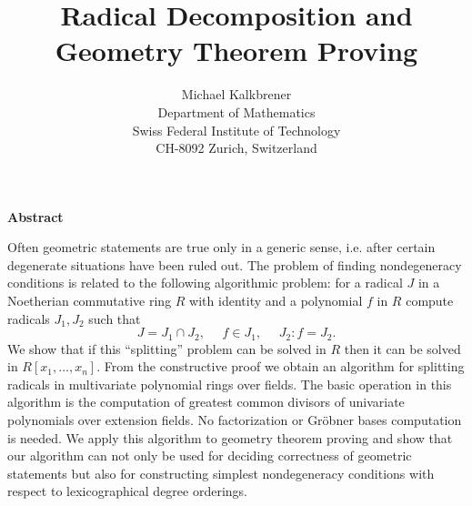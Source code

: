 \title{Radical Decomposition and Geometry Theorem Proving}
\author{Michael Kalkbrener\\Department of Mathematics\\
Swiss Federal Institute of 
Technology\\
CH-8092 Zurich, Switzerland}
\date{} 

\pagestyle{empty}
\maketitle

\vskip 1cm
\centerline{\bf Abstract}

\medskip
Often geometric statements are true only in a generic sense, i.e.
after certain degenerate situations have been ruled out. The problem of
finding nondegeneracy conditions is related to the following algorithmic
problem: for a radical $J$ in a Noetherian commutative ring $R$ with identity
and a polynomial $f$ in $R$ compute radicals $J_1,J_2$ such that 
\[ J=J_1\cap J_2,\ \ \ \ \ \ f\in J_1,\ \ \ \ \ \  J_2:f=J_2. \]
We show that
if this ``splitting'' problem can be solved in $R$ then it can be solved in
$R[x_1,\ldots,x_n]$. From the constructive proof
we obtain an algorithm for splitting radicals in multivariate polynomial
rings over fields.
The basic operation in this algorithm is the 
computation of greatest common divisors of univariate polynomials over 
extension fields. 
No factorization or Gr\"obner bases computation is
needed.
We apply this algorithm to geometry theorem proving and show
that our algorithm can not only be used for deciding correctness
of geometric
statements but
also for constructing 
simplest nondegeneracy conditions with respect
to lexicographical degree orderings.

